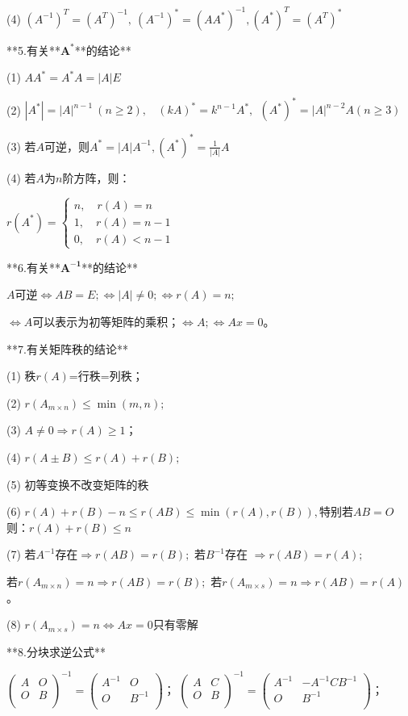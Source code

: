(4) ${(A^{- 1})}^{T} = {(A^{T})}^{- 1},\ \left( A^{- 1} \right)^{*} ={(AA^{*})}^{- 1},{(A^{*})}^{T} = \left( A^{T} \right)^{*}$

**5.有关**$\mathbf{A}^{\mathbf{*}}$**的结论**

(1) $AA^{*} = A^{*}A = |A|E$

(2) $|A^{*}| = |A|^{n - 1}\ (n \geq 2),\ \ \ \ {(kA)}^{*} = k^{n -1}A^{*},{{\ \ }\left( A^{*} \right)}^{*} = |A|^{n - 2}A(n \geq 3)$

(3) 若$A$可逆，则$A^{*} = |A|A^{- 1},{(A^{*})}^{*} = \frac{1}{|A|}A$

(4) 若$A$为$n$阶方阵，则：

$r(A^*)=\begin{cases}n,\quad r(A)=n\\ 1,\quad r(A)=n-1\\ 0,\quad r(A)<n-1\end{cases}$

**6.有关**$\mathbf{A}^{\mathbf{- 1}}$**的结论**

$A$可逆$\Leftrightarrow AB = E; \Leftrightarrow |A| \neq 0; \Leftrightarrow r(A) = n;$

$\Leftrightarrow A$可以表示为初等矩阵的乘积；$\Leftrightarrow A;\Leftrightarrow Ax = 0$。

**7.有关矩阵秩的结论**

(1) 秩$r(A)$=行秩=列秩；

(2) $r(A_{m \times n}) \leq \min(m,n);$

(3) $A \neq 0 \Rightarrow r(A) \geq 1$；

(4) $r(A \pm B) \leq r(A) + r(B);$

(5) 初等变换不改变矩阵的秩

(6) $r(A) + r(B) - n \leq r(AB) \leq \min(r(A),r(B)),$特别若$AB = O$
则：$r(A) + r(B) \leq n$

(7) 若$A^{- 1}$存在$\Rightarrow r(AB) = r(B);$ 若$B^{- 1}$存在
$\Rightarrow r(AB) = r(A);$

若$r(A_{m \times n}) = n \Rightarrow r(AB) = r(B);$ 若$r(A_{m \times s}) = n\Rightarrow r(AB) = r\left( A \right)$。

(8) $r(A_{m \times s}) = n \Leftrightarrow Ax = 0$只有零解

**8.分块求逆公式**

$\begin{pmatrix} A & O \\ O & B \\ \end{pmatrix}^{- 1} = \begin{pmatrix} A^{-1} & O \\ O & B^{- 1} \\ \end{pmatrix}$； $\begin{pmatrix} A & C \\ O & B \\\end{pmatrix}^{- 1} = \begin{pmatrix} A^{- 1}& - A^{- 1}CB^{- 1} \\ O & B^{- 1} \\ \end{pmatrix}$；

